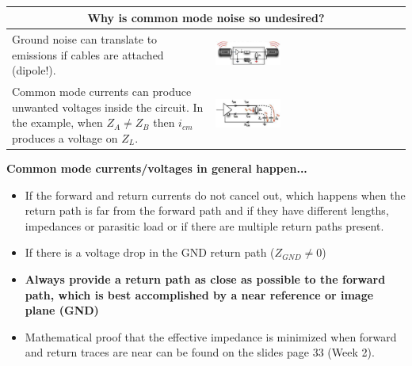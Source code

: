 		\begin{table}[h!]
		\centering
		\begin{tabular}{|m{}|m{}|}
				\multicolumn{2}{c}{\textbf{Why is common mode noise so undesired?}}
			\\
			\hline
				Ground noise can translate to emissions if cables are attached (dipole!). 
			& 
				 \begin{center}\includegraphics[width=0.35\textwidth]{images/GroundNoiseCables.png}\end{center}  
			\\
			\hline
				Common mode currents can produce unwanted voltages inside the circuit. In the example, when $Z_A \neq Z_B$ then $i_{cm}$ produces a voltage on $Z_L$.
			& 
				 \begin{center}\includegraphics[width=0.35\textwidth]{images/UndesiredVoltages.png}\end{center}  
			\\
			\hline
			\end{tabular}
		\end{table}		
		\clearpage
		\textbf{Common mode currents/voltages in general happen...}
		\begin{itemize}
			\item If the forward and return currents do not cancel out, which happens when the return path is far from the forward path and if they have different lengths, impedances or parasitic load or if there are multiple return paths present. 
			\item If there is a voltage drop in the GND return path ($Z_{GND} \neq 0$)
			\item \textbf{Always provide a return path as close as possible to the forward path, which is best accomplished by a near reference or image plane (GND)}
			\item Mathematical proof that the effective impedance is minimized when forward and return traces are near can be found on the slides page 33 (Week 2).
		\end{itemize}
		
